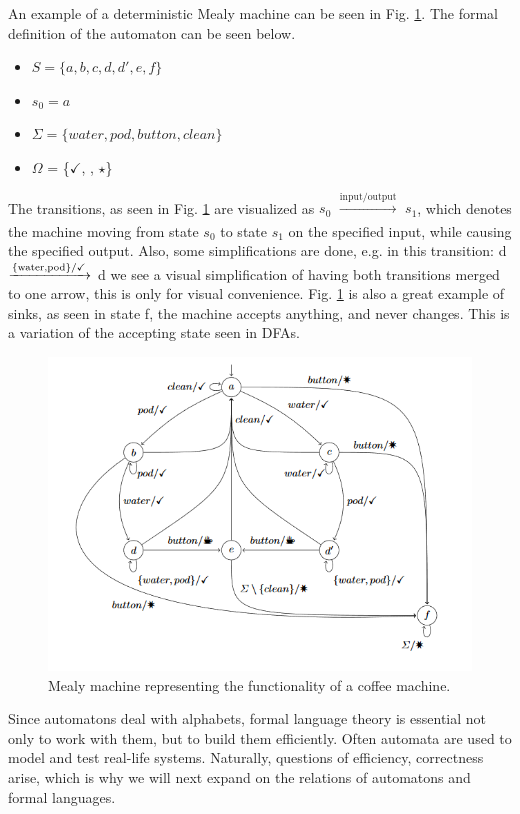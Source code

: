 \begin{example}
	\label{ex:coffeemealy}
	An example of a deterministic Mealy machine can be seen in Fig. \ref{fig:coffeemealy}. The formal definition of the automaton can be seen below.
	\begin{itemize} 
		\item $S = \{a, b, c, d, d', e, f\}$ 
		\item $s_0 = a$
		\item $\Sigma = \{water, pod, button, clean\}$
		\item $\Omega$ = \{$\checkmark$, \Coffeecup, $\star$\}
	\end{itemize}
	The transitions, as seen in Fig. \ref{fig:coffeemealy} are visualized as $s_0$ $\xrightarrow[]{\text{input/output}}$ $s_1$, which denotes the machine moving from state $s_0$ to state $s_1$ on the specified input, while causing the specified output. Also, some simplifications are done, e.g. in this transition: d $\xrightarrow[]{\text{\{water,pod\}/\checkmark}}$ d we see a visual simplification of having both transitions merged to one arrow, this is only for visual convenience. Fig. \ref{fig:coffeemealy} is also a great example of sinks, as seen in state f, the machine accepts anything, and never changes. This is a variation of the accepting state seen in DFAs.
\end{example}

\begin{figure}[H]
	\centering
	\includegraphics[width=0.7\linewidth]{content/coffeemealy}
	\caption{Mealy machine representing the functionality of a coffee machine.\cite{Steffen2011}}
	\label{fig:coffeemealy}
\end{figure}

Since automatons deal with alphabets, formal language theory is essential not only to work with them, but to build them efficiently. Often automata are used to model and test real-life systems. Naturally, questions of efficiency, correctness arise, which is why we will next expand on the relations of automatons and formal languages.

